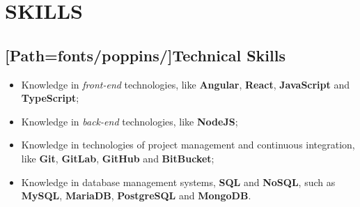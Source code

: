 
\section*{\MakeUppercase{Skills}}
\vspace{-1em}
\subsection*{[Path=fonts/poppins/]Technical Skills}

\begin{itemize}
	\item Knowledge in \textit{front-end} technologies, like \textbf{Angular}, \textbf{React}, \textbf{JavaScript} and \textbf{TypeScript};
	\item Knowledge in \textit{back-end} technologies, like \textbf{NodeJS};
	\item Knowledge in technologies of project management and continuous integration, like \textbf{Git}, \textbf{GitLab}, \textbf{GitHub} and \textbf{BitBucket};
	\item Knowledge in database management systems, \textbf{SQL} and \textbf{NoSQL}, such as \textbf{MySQL}, \textbf{MariaDB}, \textbf{PostgreSQL} and \textbf{MongoDB}.
\end{itemize}

\vspace{5pt}

